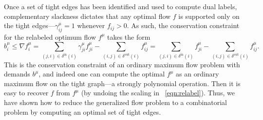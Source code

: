 \documentclass[11pt]{article}
\theoremstyle{definition}
\theoremstyle{definition}
\theoremstyle{definition}
\newcommand{\fu}{f^{\mu}}
\newcommand{\nfiu}{\nabla \fu_i}
\newcommand{\biu}{b_{i}^{\mu}}
\newcommand{\giij}{\gamma_{ij}^{\mu}}
\newcommand{\din}{\delta^{\text{in}}}
\newcommand{\dout}{\delta^{\text{out}}}
\begin{document}
	Once a set of tight edges has been identified and used to compute dual labels,
    complementary slackness dictates that any optimal flow $f$ is supported only on
    the tight edges---$\giij = 1$ 
    whenever $f_{ij} > 0$. As such, the conservation
    constraint for the relabeled optimum flow $f^\mu$ takes the form
    \[ \biu \leq \nfiu
    = \sum_{(j,i) \in \din(i)} \gamma_{ji}^{\mu} \fu_{ji} - \sum_{(i,j) \in \dout(i)} \fu_{ij}
    = \sum_{(j,i) \in \din(i)} \fu_{ji} - \sum_{(i,j) \in \dout(i)} \fu_{ij}. \]
    This is the conservation constraint of an ordinary maximum flow problem with demands
    $b^\mu$, and indeed one can compute the optimal $f^\mu$ as an
    ordinary maximum flow on the tight graph---a strongly polynomial operation.
		Then it is easy to recover $f$ from $f^\mu$ (by undoing the scaling in ~\ref{eqn:relabel}).
		Thus, we have shown how to reduce the generalized
    flow problem to a combinatorial problem by computing an optimal set of tight edges.
    
\end{document}
